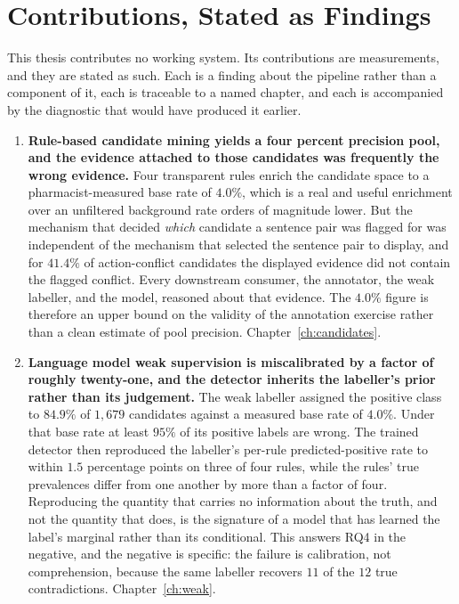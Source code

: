 \section{Contributions, Stated as Findings}
\label{sec:intro-contributions}

This thesis contributes no working system. Its contributions are measurements,
and they are stated as such. Each is a finding about the pipeline rather than a
component of it, each is traceable to a named chapter, and each is accompanied
by the diagnostic that would have produced it earlier.

\begin{enumerate}
\item \textbf{Rule-based candidate mining yields a four percent precision pool,
      and the evidence attached to those candidates was frequently the wrong
      evidence.} Four transparent rules enrich the candidate space to a
      pharmacist-measured base rate of $4.0\%$, which is a real and useful
      enrichment over an unfiltered background rate orders of magnitude lower.
      But the mechanism that decided \emph{which} candidate a sentence pair was
      flagged for was independent of the mechanism that selected the sentence
      pair to display, and for $41.4\%$ of action-conflict candidates the
      displayed evidence did not contain the flagged conflict. Every downstream
      consumer, the annotator, the weak labeller, and the model, reasoned about
      that evidence. The $4.0\%$ figure is therefore an upper bound on the
      validity of the annotation exercise rather than a clean estimate of pool
      precision. Chapter~\ref{ch:candidates}.

\item \textbf{Language model weak supervision is miscalibrated by a factor of
      roughly twenty-one, and the detector inherits the labeller's prior rather
      than its judgement.} The weak labeller assigned the positive class to
      $84.9\%$ of $1{,}679$ candidates against a measured base rate of $4.0\%$.
      Under that base rate at least $95\%$ of its positive labels are wrong. The
      trained detector then reproduced the labeller's per-rule
      predicted-positive rate to within $1.5$ percentage points on three of four
      rules, while the rules' true prevalences differ from one another by more
      than a factor of four. Reproducing the quantity that carries no
      information about the truth, and not the quantity that does, is the
      signature of a model that has learned the label's marginal rather than its
      conditional. This answers RQ4 in the negative, and the negative is
      specific: the failure is calibration, not comprehension, because the same
      labeller recovers $11$ of the $12$ true contradictions.
      Chapter~\ref{ch:weak}.


\end{enumerate}
